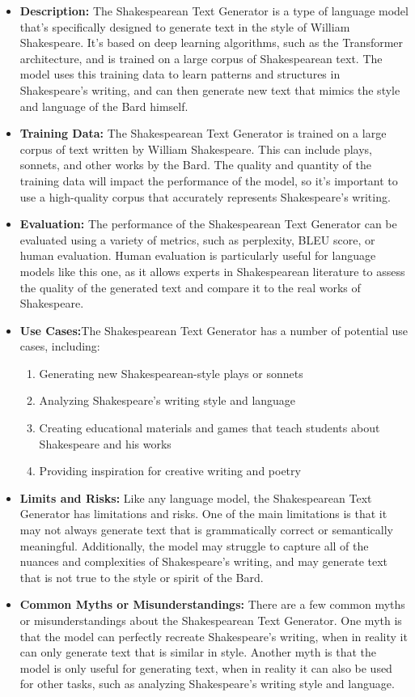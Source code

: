 \begin{itemize}
\item \textbf{Description:} The Shakespearean Text Generator is a type of language model that's specifically designed to generate text in the style of William Shakespeare. It's based on deep learning algorithms, such as the Transformer architecture, and is trained on a large corpus of Shakespearean text. The model uses this training data to learn patterns and structures in Shakespeare's writing, and can then generate new text that mimics the style and language of the Bard himself.
\item \textbf{Training Data:} The Shakespearean Text Generator is trained on a large corpus of text written by William Shakespeare. This can include plays, sonnets, and other works by the Bard. The quality and quantity of the training data will impact the performance of the model, so it's important to use a high-quality corpus that accurately represents Shakespeare's writing.
\item \textbf{Evaluation:} The performance of the Shakespearean Text Generator can be evaluated using a variety of metrics, such as perplexity, BLEU score, or human evaluation. Human evaluation is particularly useful for language models like this one, as it allows experts in Shakespearean literature to assess the quality of the generated text and compare it to the real works of Shakespeare.
\item \textbf{Use Cases:}The Shakespearean Text Generator has a number of potential use cases, including:
    \begin{enumerate}
        \item Generating new Shakespearean-style plays or sonnets
        \item Analyzing Shakespeare's writing style and language
        \item Creating educational materials and games that teach students about Shakespeare and his works
        \item Providing inspiration for creative writing and poetry
        \end{enumerate}
\item \textbf{Limits and Risks:} Like any language model, the Shakespearean Text Generator has limitations and risks. One of the main limitations is that it may not always generate text that is grammatically correct or semantically meaningful. Additionally, the model may struggle to capture all of the nuances and complexities of Shakespeare's writing, and may generate text that is not true to the style or spirit of the Bard.
\item \textbf{Common Myths or Misunderstandings:}
There are a few common myths or misunderstandings about the Shakespearean Text Generator. One myth is that the model can perfectly recreate Shakespeare's writing, when in reality it can only generate text that is similar in style. Another myth is that the model is only useful for generating text, when in reality it can also be used for other tasks, such as analyzing Shakespeare's writing style and language.
\end{itemize}

